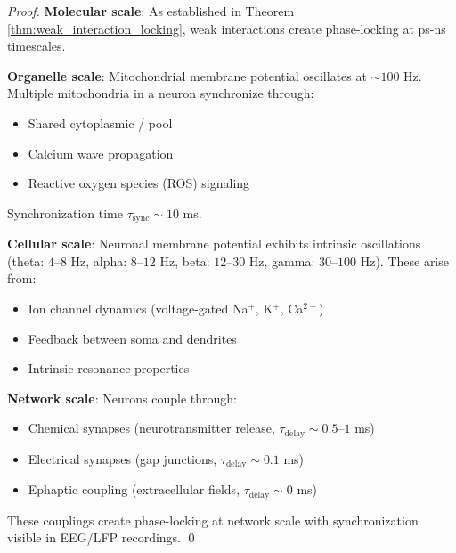 \begin{proof}
\textbf{Molecular scale}: As established in Theorem \ref{thm:weak_interaction_locking}, weak interactions create phase-locking at ps-ns timescales.

\textbf{Organelle scale}: Mitochondrial membrane potential oscillates at $\sim 100$ Hz. Multiple mitochondria in a neuron synchronize through:
\begin{itemize}
\item Shared cytoplasmic / pool
\item Calcium wave propagation
\item Reactive oxygen species (ROS) signaling
\end{itemize}
Synchronization time $\tau_{\text{sync}} \sim 10$ ms.

\textbf{Cellular scale}: Neuronal membrane potential exhibits intrinsic oscillations (theta: $4$--$8$ Hz, alpha: $8$--$12$ Hz, beta: $12$--$30$ Hz, gamma: $30$--$100$ Hz). These arise from:
\begin{itemize}
\item Ion channel dynamics (voltage-gated Na$^+$, K$^+$, Ca$^{2+}$)
\item Feedback between soma and dendrites
\item Intrinsic resonance properties
\end{itemize}

\textbf{Network scale}: Neurons couple through:
\begin{itemize}
\item Chemical synapses (neurotransmitter release, $\tau_{\text{delay}} \sim 0.5$--$1$ ms)
\item Electrical synapses (gap junctions, $\tau_{\text{delay}} \sim 0.1$ ms)
\item Ephaptic coupling (extracellular fields, $\tau_{\text{delay}} \sim 0$ ms)
\end{itemize}

These couplings create phase-locking at network scale with synchronization visible in EEG/LFP recordings. \qed
\end{proof}

